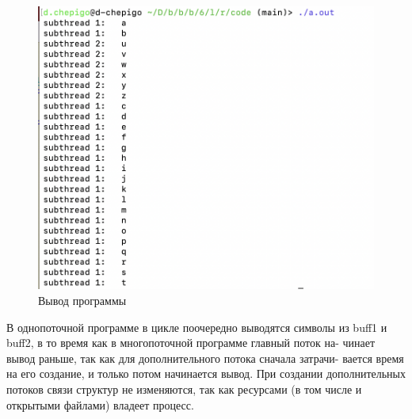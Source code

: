 \begin{figure}[!h]
	\centering
	\includegraphics[width=\textwidth]{image/1-2}
	\caption{Вывод программы}
\end{figure}
\newpage

В однопоточной программе в цикле поочередно выводятся символы из buff1 и buff2, в то время как в многопоточной программе главный поток на- чинает вывод раньше, так как для дополнительного потока сначала затрачи- вается время на его создание, и только потом начинается вывод.
При создании дополнительных потоков связи структур не изменяются, так как ресурсами (в том числе и открытыми файлами) владеет процесс.


